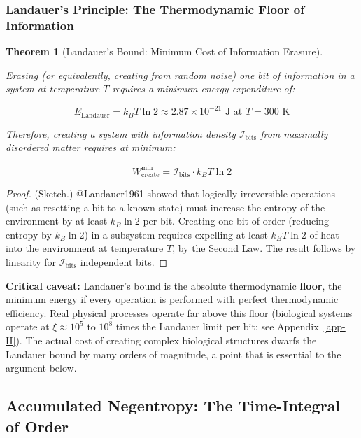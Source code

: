 \documentclass[11pt]{article}
\theoremstyle{plain}
\newtheorem{theorem}{Theorem}
\theoremstyle{definition}
\theoremstyle{remark}
\let\origsubsection\subsection
\renewcommand{\subsection}{\needspace{7\baselineskip}\origsubsection}
\let\origsubsubsection\subsubsection
\renewcommand{\subsubsection}{\needspace{4\baselineskip}\origsubsubsection}
\begin{document}
\subsubsection{Landauer's Principle: The Thermodynamic Floor of
Information}\label{landauers-principle-the-thermodynamic-floor-of-information}

\begin{theorem}[Landauer's Bound: Minimum Cost of Information Erasure]
\label{thm-landauer-bound}

Erasing (or equivalently, creating from random noise) one bit of information in a system at temperature $T$ requires a minimum energy expenditure of:

$$E_{\text{Landauer}} = k_B T \ln 2 \approx 2.87 \times 10^{-21} \text{ J at } T = 300\text{ K}$$

Therefore, creating a system with information density $\mathcal{I}_{\text{bits}}$ from maximally disordered matter requires at minimum:

$$W_{\text{create}}^{\min} = \mathcal{I}_{\text{bits}} \cdot k_B T \ln 2$$
\end{theorem}

\begin{proof}
(Sketch.) @Landauer1961 showed that logically irreversible operations (such as resetting a bit to a known state) must increase the entropy of the environment by at least $k_B \ln 2$ per bit. Creating one bit of order (reducing entropy by $k_B \ln 2$) in a subsystem requires expelling at least $k_B T \ln 2$ of heat into the environment at temperature $T$, by the Second Law. The result follows by linearity for $\mathcal{I}_{\text{bits}}$ independent bits.
\end{proof}

\textbf{Critical caveat:} Landauer's bound is the absolute thermodynamic
\textbf{floor}, the minimum energy if every operation is performed with
perfect thermodynamic efficiency. Real physical processes operate far
above this floor (biological systems operate at \(\xi \approx 10^5\) to
\(10^8\) times the Landauer limit per bit; see Appendix~\ref{app-II}).
The actual cost of creating complex biological structures dwarfs the
Landauer bound by many orders of magnitude, a point that is essential to
the argument below.

\subsection{Accumulated Negentropy: The Time-Integral of
Order}\label{accumulated-negentropy-the-time-integral-of-order}
\end{document}
